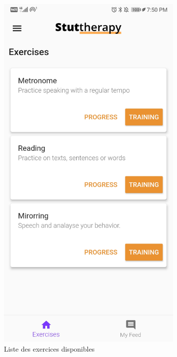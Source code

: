 \begin{appendices}
\begin{landscape}
\begin{figure}[h]
\begin{subfigure}{.25\textwidth}
    \includegraphics[width=.75\linewidth]{content/imgs/screen2.jpg}
    \caption{Liste des exercices disponibles}
  \end{subfigure}%
  \begin{subfigure}{.25\textwidth}
    \centering

\end{subfigure}
\end{figure}
\end{landscape}
\end{appendices}
